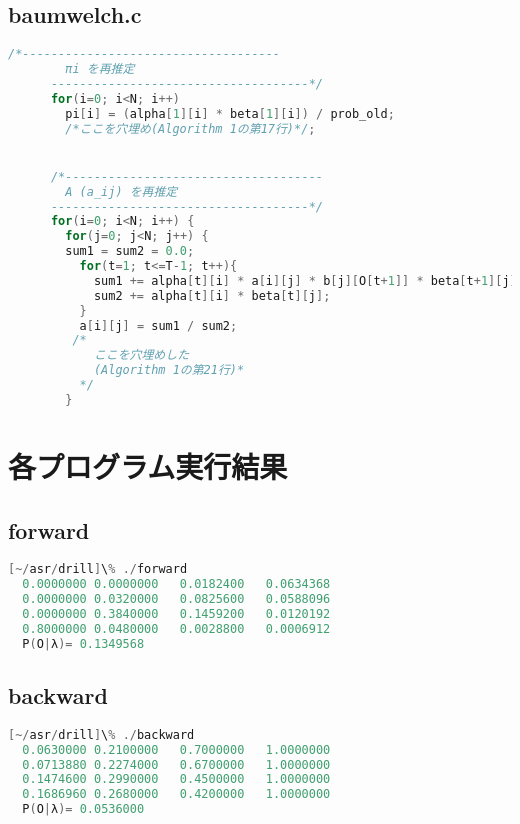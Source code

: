 \documentclass[11pt,a4paper, uplatex]{jsarticle}
\begin{document}
\subsection{baumwelch.c}

\begin{lstlisting}[language=c, breaklines = true, caption=\texttt{baumWelch}関数一部]
      /*------------------------------------
        πi を再推定
      ------------------------------------*/
      for(i=0; i<N; i++)
        pi[i] = (alpha[1][i] * beta[1][i]) / prob_old;
        /*ここを穴埋め(Algorithm 1の第17行)*/;


      /*------------------------------------
        A (a_ij) を再推定
      ------------------------------------*/
      for(i=0; i<N; i++) {
        for(j=0; j<N; j++) {
    	sum1 = sum2 = 0.0;
          for(t=1; t<=T-1; t++){
            sum1 += alpha[t][i] * a[i][j] * b[j][O[t+1]] * beta[t+1][j];
            sum2 += alpha[t][i] * beta[t][j];
          }
          a[i][j] = sum1 / sum2;
         /*
            ここを穴埋めした
            (Algorithm 1の第21行)*
          */
        }
\end{lstlisting}

\section{各プログラム実行結果}
\subsection{forward}

\begin{lstlisting}[language=c, caption=\texttt{forward}実行結果]
  [~/asr/drill]\% ./forward
  0.0000000	0.0000000	0.0182400	0.0634368
  0.0000000	0.0320000	0.0825600	0.0588096
  0.0000000	0.3840000	0.1459200	0.0120192
  0.8000000	0.0480000	0.0028800	0.0006912
  P(O|λ)= 0.1349568
\end{lstlisting}

\subsection{backward}

\begin{lstlisting}[language=c, caption=\texttt{backward}実行結果]
  [~/asr/drill]\% ./backward
  0.0630000	0.2100000	0.7000000	1.0000000
  0.0713880	0.2274000	0.6700000	1.0000000
  0.1474600	0.2990000	0.4500000	1.0000000
  0.1686960	0.2680000	0.4200000	1.0000000
  P(O|λ)= 0.0536000
\end{lstlisting}
\end{document}
